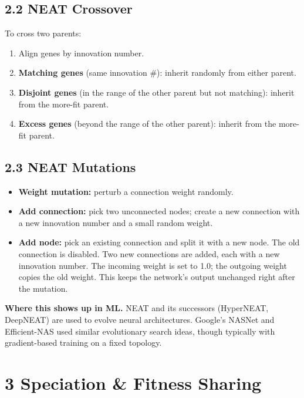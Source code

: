 \documentclass[a4paper,11pt]{article}
\begin{document}
\subsection{2.2 NEAT Crossover}

To cross two parents:
\begin{enumerate}[label=\arabic*.]
  \item Align genes by innovation number.
  \item \textbf{Matching genes} (same innovation \#): inherit randomly from either parent.
  \item \textbf{Disjoint genes} (in the range of the other parent but not matching): inherit from the more-fit parent.
  \item \textbf{Excess genes} (beyond the range of the other parent): inherit from the more-fit parent.
\end{enumerate}

\subsection{2.3 NEAT Mutations}

\begin{itemize}
  \item \textbf{Weight mutation:} perturb a connection weight randomly.
  \item \textbf{Add connection:} pick two unconnected nodes; create a new connection with a new innovation number and a small random weight.
  \item \textbf{Add node:} pick an existing connection and split it with a new node.
        The old connection is disabled. Two new connections are added, each with a new innovation number.
        The incoming weight is set to 1.0; the outgoing weight copies the old weight.
        This keeps the network's output unchanged right after the mutation.
\end{itemize}

\textbf{Where this shows up in ML.} NEAT and its successors (HyperNEAT, DeepNEAT) are used to evolve neural architectures. Google's NASNet and Efficient-NAS used similar evolutionary search ideas, though typically with gradient-based training on a fixed topology.

\section{3 \quad Speciation \& Fitness Sharing}
\end{document}
